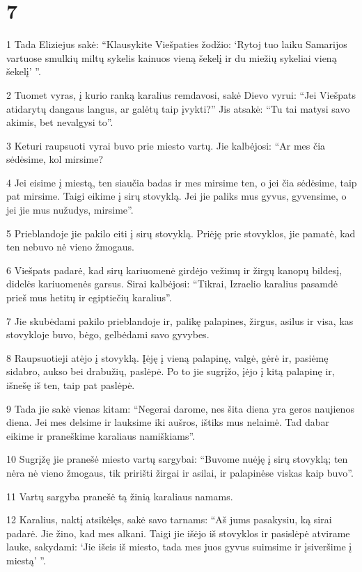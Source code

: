 \chapter{7}

\par 1 Tada Eliziejus sakė: “Klausykite Viešpaties žodžio: ‘Rytoj tuo laiku Samarijos vartuose smulkių miltų sykelis kainuos vieną šekelį ir du miežių sykeliai vieną šekelį’ ”. 
\par 2 Tuomet vyras, į kurio ranką karalius remdavosi, sakė Dievo vyrui: “Jei Viešpats atidarytų dangaus langus, ar galėtų taip įvykti?” Jis atsakė: “Tu tai matysi savo akimis, bet nevalgysi to”. 
\par 3 Keturi raupsuoti vyrai buvo prie miesto vartų. Jie kalbėjosi: “Ar mes čia sėdėsime, kol mirsime? 
\par 4 Jei eisime į miestą, ten siaučia badas ir mes mirsime ten, o jei čia sėdėsime, taip pat mirsime. Taigi eikime į sirų stovyklą. Jei jie paliks mus gyvus, gyvensime, o jei jie mus nužudys, mirsime”. 
\par 5 Prieblandoje jie pakilo eiti į sirų stovyklą. Priėję prie stovyklos, jie pamatė, kad ten nebuvo nė vieno žmogaus. 
\par 6 Viešpats padarė, kad sirų kariuomenė girdėjo vežimų ir žirgų kanopų bildesį, didelės kariuomenės garsus. Sirai kalbėjosi: “Tikrai, Izraelio karalius pasamdė prieš mus hetitų ir egiptiečių karalius”. 
\par 7 Jie skubėdami pakilo prieblandoje ir, palikę palapines, žirgus, asilus ir visa, kas stovykloje buvo, bėgo, gelbėdami savo gyvybes. 
\par 8 Raupsuotieji atėjo į stovyklą. Įėję į vieną palapinę, valgė, gėrė ir, pasiėmę sidabro, aukso bei drabužių, paslėpė. Po to jie sugrįžo, įėjo į kitą palapinę ir, išnešę iš ten, taip pat paslėpė. 
\par 9 Tada jie sakė vienas kitam: “Negerai darome, nes šita diena yra geros naujienos diena. Jei mes delsime ir lauksime iki aušros, ištiks mus nelaimė. Tad dabar eikime ir praneškime karaliaus namiškiams”. 
\par 10 Sugrįžę jie pranešė miesto vartų sargybai: “Buvome nuėję į sirų stovyklą; ten nėra nė vieno žmogaus, tik pririšti žirgai ir asilai, ir palapinėse viskas kaip buvo”. 
\par 11 Vartų sargyba pranešė tą žinią karaliaus namams. 
\par 12 Karalius, naktį atsikėlęs, sakė savo tarnams: “Aš jums pasakysiu, ką sirai padarė. Jie žino, kad mes alkani. Taigi jie išėjo iš stovyklos ir pasislėpė atvirame lauke, sakydami: ‘Jie išeis iš miesto, tada mes juos gyvus suimsime ir įsiveršime į miestą’ ”. 
